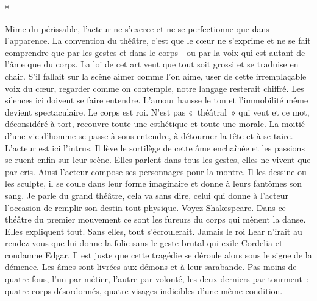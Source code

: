 \documentclass{book}
\begin{document}
\begin{center}
*
\end{center}

Mime du périssable, l'acteur ne s'exerce et ne se perfectionne que dans l'apparence. La convention du théâtre, c'est que le cœur ne s'exprime et ne se fait comprendre que par les gestes et dans le corps ‑ ou par la voix qui est autant de l'âme que du corps. La loi de cet art veut que tout soit grossi et se traduise en chair. S'il fallait sur la scène aimer comme l'on aime, user de cette irremplaçable voix du cœur, regarder comme on contemple, notre langage resterait chiffré. Les silences ici doivent se faire entendre. L'amour hausse le ton et l'immobilité même devient spectaculaire. Le corps est roi. N'est pas « théâtral » qui veut et ce mot, déconsidéré à tort, recouvre toute une esthétique et toute une morale. La moitié d'une vie d'homme se passe à sous‑entendre, à détourner la tête et à se taire. L'acteur est ici l'intrus. Il lève le sortilège de cette âme enchaînée et les passions se ruent enfin sur leur scène. Elles parlent dans tous les gestes, elles ne vivent que par cris. Ainsi l'acteur compose ses personnages pour la montre. Il les dessine ou les sculpte, il se coule dans leur forme imaginaire et donne à leurs fantômes son sang. Je parle du grand théâtre, cela va sans dire, celui qui donne à l'acteur l'occasion de remplir son destin tout physique. Voyez Shakespeare. Dans ce théâtre du premier mouvement ce sont les fureurs du corps qui mènent la danse. Elles expliquent tout. Sans elles, tout s'écroulerait. Jamais le roi Lear n'irait au rendez-vous que lui donne la folie sans le geste brutal qui exile Cordelia et condamne Edgar. Il est juste que cette tragédie se déroule alors sous le signe de la démence. Les âmes sont livrées aux démons et à leur sarabande. Pas moins de quatre fous, l'un par métier, l'autre par volonté, les deux derniers par tourment : quatre corps désordonnés, quatre visages indicibles d'une même condition.
\end{document}
